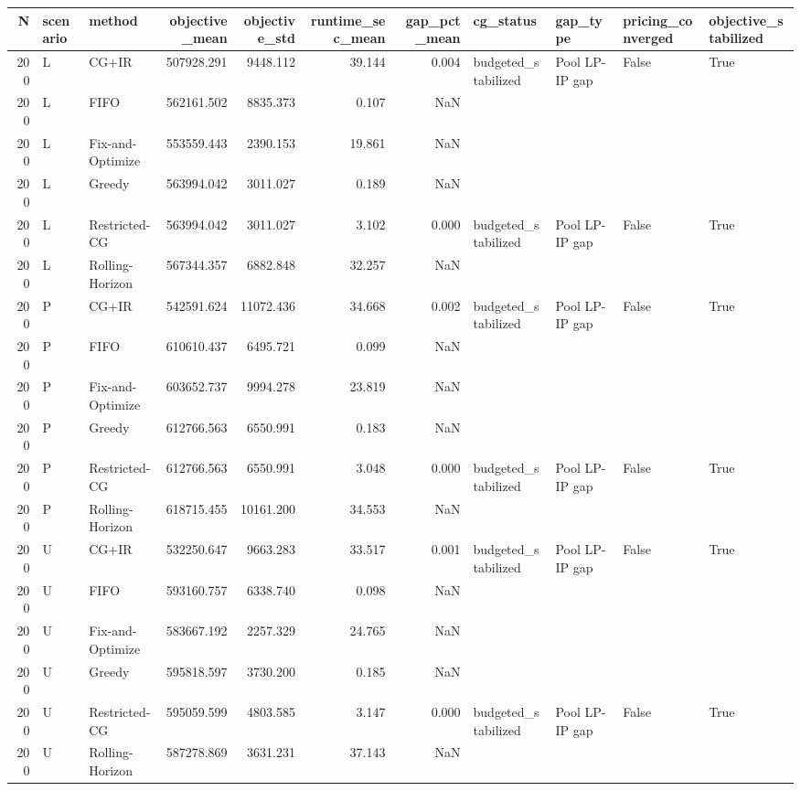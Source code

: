 \begin{tabular}{rllrrrrllll}
\toprule
N & scenario & method & objective_mean & objective_std & runtime_sec_mean & gap_pct_mean & cg_status & gap_type & pricing_converged & objective_stabilized \\
\midrule
200 & L & CG+IR & 507928.291 & 9448.112 & 39.144 & 0.004 & budgeted_stabilized & Pool LP-IP gap & False & True \\
200 & L & FIFO & 562161.502 & 8835.373 & 0.107 & NaN &  &  &  &  \\
200 & L & Fix-and-Optimize & 553559.443 & 2390.153 & 19.861 & NaN &  &  &  &  \\
200 & L & Greedy & 563994.042 & 3011.027 & 0.189 & NaN &  &  &  &  \\
200 & L & Restricted-CG & 563994.042 & 3011.027 & 3.102 & 0.000 & budgeted_stabilized & Pool LP-IP gap & False & True \\
200 & L & Rolling-Horizon & 567344.357 & 6882.848 & 32.257 & NaN &  &  &  &  \\
200 & P & CG+IR & 542591.624 & 11072.436 & 34.668 & 0.002 & budgeted_stabilized & Pool LP-IP gap & False & True \\
200 & P & FIFO & 610610.437 & 6495.721 & 0.099 & NaN &  &  &  &  \\
200 & P & Fix-and-Optimize & 603652.737 & 9994.278 & 23.819 & NaN &  &  &  &  \\
200 & P & Greedy & 612766.563 & 6550.991 & 0.183 & NaN &  &  &  &  \\
200 & P & Restricted-CG & 612766.563 & 6550.991 & 3.048 & 0.000 & budgeted_stabilized & Pool LP-IP gap & False & True \\
200 & P & Rolling-Horizon & 618715.455 & 10161.200 & 34.553 & NaN &  &  &  &  \\
200 & U & CG+IR & 532250.647 & 9663.283 & 33.517 & 0.001 & budgeted_stabilized & Pool LP-IP gap & False & True \\
200 & U & FIFO & 593160.757 & 6338.740 & 0.098 & NaN &  &  &  &  \\
200 & U & Fix-and-Optimize & 583667.192 & 2257.329 & 24.765 & NaN &  &  &  &  \\
200 & U & Greedy & 595818.597 & 3730.200 & 0.185 & NaN &  &  &  &  \\
200 & U & Restricted-CG & 595059.599 & 4803.585 & 3.147 & 0.000 & budgeted_stabilized & Pool LP-IP gap & False & True \\
200 & U & Rolling-Horizon & 587278.869 & 3631.231 & 37.143 & NaN &  &  &  &  \\
\bottomrule
\end{tabular}
